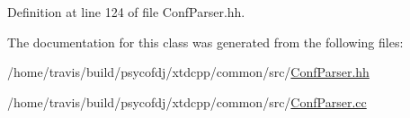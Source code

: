Definition at line 124 of file Conf\-Parser.\-hh.



The documentation for this class was generated from the following files\-:\begin{DoxyCompactItemize}
\item 
/home/travis/build/psycofdj/xtdcpp/common/src/\hyperlink{ConfParser_8hh}{Conf\-Parser.\-hh}\item 
/home/travis/build/psycofdj/xtdcpp/common/src/\hyperlink{ConfParser_8cc}{Conf\-Parser.\-cc}\end{DoxyCompactItemize}
